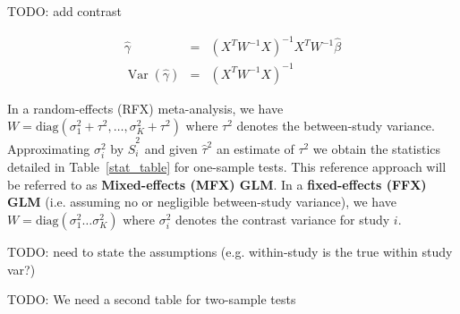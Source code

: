 \documentclass[preprint]{elsarticle}
\DeclareMathOperator{\Var}{Var}
\newcommand{\effectvector}{\hat\beta}
\newcommand{\vareffect}[1][i]{\hat S^2_{#1}}
\newcommand{\nStudies}{K}
\newcommand{\metaanalyticeffect}{\gamma}
\newcommand{\varBetween}{\tau^2}
\newcommand{\estvarBetween}{\hat\tau^2}
\newcommand{\varWithin}[1][i]{\sigma^2_{#1}}
\newcommand{\transpose}{^T}
\begin{document}
TODO: add contrast

\begin{eqnarray}
	\hat \metaanalyticeffect  &=& (X\transpose W^{-1} X)^{-1} X\transpose W^{-1} \effectvector \\
	\Var(\hat \metaanalyticeffect)  &=& (X\transpose W^{-1} X)^{-1}
	\label{eq_WLS}
\end{eqnarray}

In a random-effects (RFX) meta-analysis, we have $W = \mathrm{diag}( \varWithin[1] + \varBetween, \ldots ,\varWithin[\nStudies] + \varBetween )$ where $\varBetween$ denotes the between-study variance. Approximating $\varWithin$ by $\vareffect$ and given $\estvarBetween$ an estimate of $\varBetween$ we obtain the statistics detailed in Table~\ref{stat_table} for one-sample tests. This reference approach will be referred to as \textbf{Mixed-effects (MFX) GLM}.
In a \textbf{fixed-effects (FFX) GLM} (i.e. assuming no or negligible between-study variance), we have $W = \mathrm{diag}( \varWithin[1] \ldots \varWithin[\nStudies] )$ where $\varWithin$ denotes the contrast variance for study $i$. 

TODO: need to state the assumptions (e.g. within-study is the true within study var?)

TODO: We need a second table for two-sample tests
\end{document}

